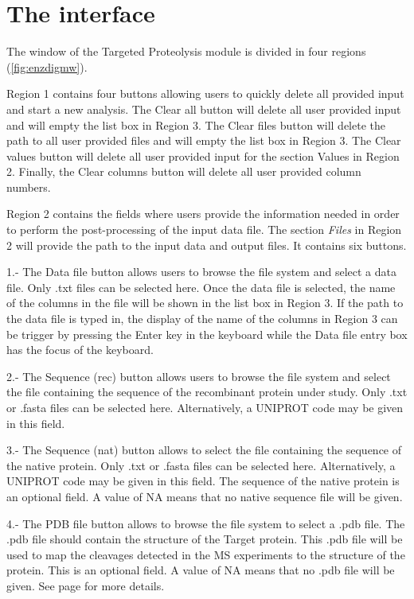 \section{The interface}

The window of the Targeted Proteolysis module is divided in four regions (\autoref{fig:enzdigmw}). 

Region \num{1} contains four buttons allowing users to quickly delete all provided input and start a new analysis. The Clear all button will delete all user provided input and will empty the list box in Region \num{3}. The Clear files button will delete the path to all user provided files and will empty the list box in Region \num{3}. The Clear values button will delete all user provided input for the section Values in Region \num{2}. Finally, the Clear columns button will delete all user provided column numbers. 

Region \num{2} contains the fields where users provide the information needed in order to perform the post-processing of the input data file. The section \textit{Files} in Region \num{2} will provide the path to the input data and output files. It contains six buttons. 

\num{1}.- The Data file button allows users to browse the file system and select a data file. Only .txt files can be selected here. Once the data file is selected, the name of the columns in the file will be shown in the list box in Region \num{3}. If the path to the data file is typed in, the display of the name of the columns in Region \num{3} can be trigger by pressing the Enter key in the keyboard while the Data file entry box has the focus of the keyboard.

\num{2}.- The Sequence (rec) button allows users to browse the file system and select the file containing the sequence of the recombinant protein under study. Only .txt or .fasta files can be selected here. Alternatively,  a UNIPROT code may be given in this field.

\num{3}.- The Sequence (nat) button allows to select the file containing the sequence of the native protein. Only .txt or .fasta files can be selected here. Alternatively, a UNIPROT code may be given in this field. The sequence of the native protein is an optional field. A value of NA means that no native sequence file will be given. 

\num{4}.- The PDB file button allows to browse the file system to select a .pdb file. The .pdb file should contain the structure of the Target protein. This .pdb file will be used to map the cleavages detected in the MS experiments to the structure of the protein. This is an optional field. A value of NA means that no .pdb file will be given. See page \pageref{par:pdbID} for more details. 

